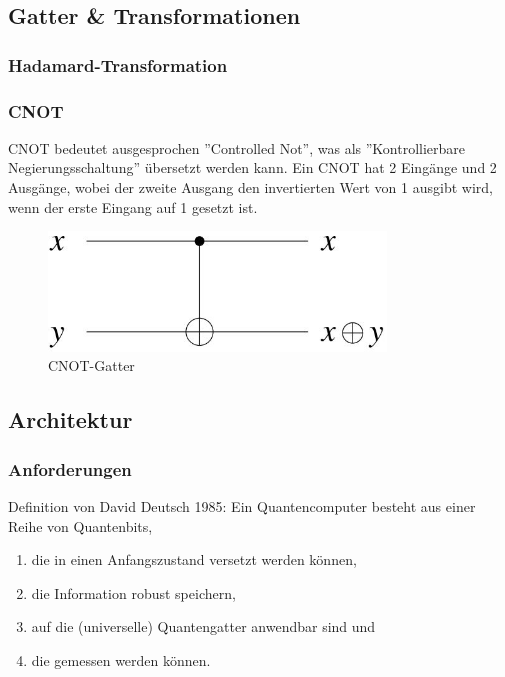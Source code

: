 \subsection{Gatter \& Transformationen}
\label{sec:gatter}

\subsubsection{Hadamard-Transformation}
\label{sec:hadamard}





\subsubsection{CNOT}
\label{sec:cnot}

CNOT bedeutet ausgesprochen ''Controlled Not'', was als ''Kontrollierbare Negierungsschaltung'' übersetzt werden kann.
Ein CNOT hat 2 Eingänge und 2 Ausgänge, wobei der zweite Ausgang den invertierten Wert von 1 ausgibt wird, wenn der erste Eingang auf 1 gesetzt ist.

\begin{figure}[!htb]
	\centering\includegraphics[width=0.8\textwidth]{images/cnot.jpg}
	\caption{CNOT-Gatter}
	\label{cnot}
\end{figure}

\subsection{Architektur}
\label{sec:architektur}

\subsubsection{Anforderungen}
\label{sec:anforderungen}

Definition von David Deutsch 1985:
Ein Quantencomputer besteht aus einer Reihe von Quantenbits,
\begin{enumerate}
	\item die in einen Anfangszustand versetzt werden können,
	\item die Information robust speichern,
	\item auf die (universelle) Quantengatter anwendbar sind und
	\item die gemessen werden können.
\end{enumerate}

